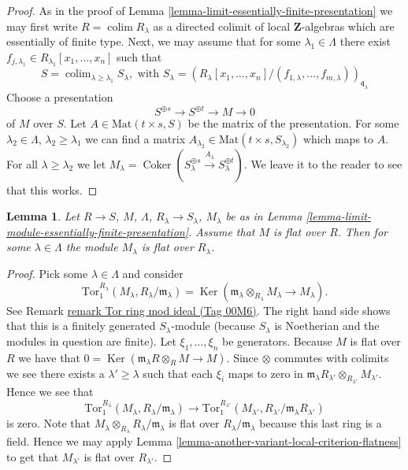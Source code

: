 \documentclass{amsart}
\theoremstyle{plain}
\newtheorem{lemma}[subsection]{Lemma}
\theoremstyle{definition}
\theoremstyle{remark}
\numberwithin{equation}{subsection}
\def\colim{\mathop{\mathrm{colim}}\nolimits}
\def\Ker{\mathop{\mathrm{Ker}}}
\def\Coker{\mathop{\mathrm{Coker}}}
\begin{document}
\begin{proof}
As in the proof of Lemma \ref{lemma-limit-essentially-finite-presentation}
we may first write $R = \colim R_\lambda$ as a directed colimit
of local $\mathbf{Z}$-algebras which are essentially of finite type.
Next, we may assume that for some $\lambda_1 \in \Lambda$ there
exist $f_{j, \lambda_1} \in R_{\lambda_1}[x_1, \ldots, x_n]$
such that
$$
S =
\colim_{\lambda \geq \lambda_1} S_\lambda, \text{ with }
S_\lambda =
(R_\lambda[x_1, \ldots, x_n]/
(f_{1, \lambda}, \ldots, f_{m, \lambda}))_{\mathfrak q_\lambda}
$$
Choose a presentation
$$
S^{\oplus s} \to S^{\oplus t} \to M \to 0
$$
of $M$ over $S$. Let $A \in \text{Mat}(t \times s, S)$ be
the matrix of the presentation. For some $\lambda_2 \in \Lambda$,
$\lambda_2 \geq \lambda_1$
we can find a matrix $A_{\lambda_2} \in \text{Mat}(t \times s, S_{\lambda_2})$
which maps to $A$. For all $\lambda \geq \lambda_2$ we let
$M_\lambda = \Coker(S_\lambda^{\oplus s} \xrightarrow{A_\lambda}
S_\lambda^{\oplus t})$. We leave it to the reader to see that
this works.
\end{proof}


\begin{lemma}
\label{lemma-colimit-eventually-flat}
Let $R \to S$, $M$, $\Lambda$, $R_\lambda \to S_\lambda$, $M_\lambda$
be as in Lemma \ref{lemma-limit-module-essentially-finite-presentation}.
Assume that $M$ is flat over $R$.
Then for some $\lambda \in \Lambda$ the module
$M_\lambda$ is flat over $R_\lambda$.
\end{lemma}

\begin{proof}
Pick some $\lambda \in \Lambda$ and consider
$$
\text{Tor}_1^{R_\lambda}(M_\lambda, R_\lambda/\mathfrak m_\lambda)
=
\Ker(\mathfrak m_\lambda \otimes_{R_\lambda} M_\lambda
\to M_\lambda).
$$
See Remark \href{https://stacks.math.columbia.edu/tag/00M6}{remark Tor ring mod ideal (Tag 00M6)}. The right hand side
shows that this is a finitely generated $S_\lambda$-module (because
$S_\lambda$ is Noetherian and the modules in question are finite).
Let $\xi_1, \ldots, \xi_n$ be generators.
Because $M$ is flat over $R$ we
have that $0 = \Ker(\mathfrak m_\lambda R \otimes_R M \to M)$.
Since $\otimes$ commutes with colimits we see there exists
a $\lambda' \geq \lambda$ such that each $\xi_i$ maps to
zero in
$\mathfrak m_{\lambda}R_{\lambda'} \otimes_{R_{\lambda'}} M_{\lambda'}$.
Hence we see that
$$
\text{Tor}_1^{R_\lambda}(M_\lambda, R_\lambda/\mathfrak m_\lambda)
\longrightarrow
\text{Tor}_1^{R_{\lambda'}}(M_{\lambda'},
R_{\lambda'}/\mathfrak m_{\lambda}R_{\lambda'})
$$
is zero. Note that
$M_\lambda \otimes_{R_\lambda} R_\lambda/\mathfrak m_\lambda$
is flat over $R_\lambda/\mathfrak m_\lambda$ because this last
ring is a field. Hence we may apply Lemma
\ref{lemma-another-variant-local-criterion-flatness}
to get that $M_{\lambda'}$ is flat over $R_{\lambda'}$.
\end{proof}
\end{document}
